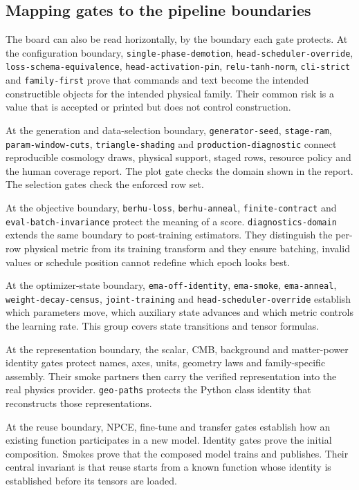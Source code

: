 \documentclass[10pt,aps,prd,twocolumn,nofootinbib]{revtex4-2}
\newcommand{\code}[1]{\texttt{#1}}
\begin{document}
\subsection{Mapping gates to the pipeline boundaries}

The board can also be read horizontally, by the boundary each gate protects.
At the configuration boundary, \code{single-phase-demotion},
\code{head-scheduler-override}, \code{loss-schema-equivalence},
\code{head-activation-pin}, \code{relu-tanh-norm}, \code{cli-strict} and
\code{family-first} prove that commands and text become the intended
constructible objects for the intended physical family.  Their common risk is
a value that is accepted or printed but does not control construction.

At the generation and data-selection boundary, \code{generator-seed},
\code{stage-ram}, \code{param-window-cuts}, \code{triangle-shading} and
\code{production-diagnostic} connect reproducible cosmology draws, physical
support, staged rows, resource policy and the human coverage report.  The
plot gate checks the domain shown in the report.  The selection gates check
the enforced row set.

At the objective boundary, \code{berhu-loss},
\code{berhu-anneal}, \code{finite-contract} and
\code{eval-batch-invariance} protect the meaning of a score.
\code{diagnostics-domain} extends the same boundary to post-training
estimators.  They distinguish the per-row physical metric from its training
transform and they ensure batching, invalid values or schedule position
cannot redefine which epoch looks best.

At the optimizer-state boundary, \code{ema-off-identity},
\code{ema-smoke}, \code{ema-anneal}, \code{weight-decay-census},
\code{joint-training} and \code{head-scheduler-override} establish which
parameters move, which auxiliary state advances and which metric controls
the learning rate.  This group covers state transitions and tensor formulas.

At the representation boundary, the scalar, CMB, background and matter-power
identity gates protect names, axes, units, geometry laws and family-specific
assembly.  Their smoke partners then carry the verified representation into
the real physics provider.  \code{geo-paths} protects the Python class identity
that reconstructs those representations.

At the reuse boundary, NPCE, fine-tune and transfer gates establish how an
existing function participates in a new model.  Identity gates prove the
initial composition.  Smokes prove that the composed model trains and
publishes.  Their central invariant is that reuse starts from a known function
whose identity is established before its tensors are loaded.
\end{document}
